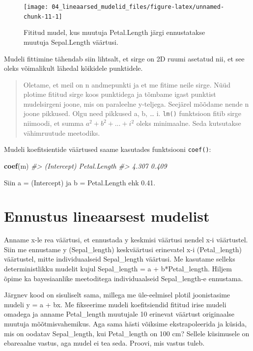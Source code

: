\documentclass[]{book}
\newenvironment{Shaded}{\begin{snugshade}}{\end{snugshade}}
\newcommand{\KeywordTok}[1]{\textcolor[rgb]{0.13,0.29,0.53}{\textbf{#1}}}
\newcommand{\CommentTok}[1]{\textcolor[rgb]{0.56,0.35,0.01}{\textit{#1}}}
\newcommand{\NormalTok}[1]{#1}
\begin{document}
\begin{figure}

{\centering \texttt{[image: 04\_lineaarsed\_mudelid\_files/figure-latex/unnamed-chunk-11-1]} 

}

\caption{Fititud mudel, kus muutuja Petal.Length järgi ennustatakse muutuja Sepal.Length väärtusi.}\label{fig:unnamed-chunk-11}
\end{figure}

Mudeli fittimine tähendab siin lihtsalt, et sirge on 2D ruumi asetatud
nii, et see oleks võimalikult lähedal kõikidele punktidele.

\begin{quote}
Oletame, et meil on n andmepunkti ja et me fitime neile sirge. Nüüd
plotime fititud sirge koos punktidega ja tõmbame igast punktist
mudelsirgeni joone, mis on paraleelne y-teljega. Seejärel mõõdame nende
n joone pikkused. Olgu need pikkused a, b, \ldots{} i. \texttt{lm()}
funktsioon fitib sirge niimoodi, et summa \(a^2 + b^2 + ... + i^2\)
oleks minimaalne. Seda kutsutakse vähimruutude meetodiks.
\end{quote}

Mudeli koefitsientide väärtused saame kasutades funktsiooni
\texttt{coef()}:

\begin{Shaded}
\begin{Highlighting}[]
\KeywordTok{coef}\NormalTok{(m)}
\CommentTok{#>  (Intercept) Petal.Length }
\CommentTok{#>        4.307        0.409}
\end{Highlighting}
\end{Shaded}

Siin a = (Intercept) ja b = Petal.Length ehk 0.41.

\section{Ennustus lineaarsest
mudelist}\label{ennustus-lineaarsest-mudelist}

Anname x-le rea väärtusi, et ennustada y keskmisi väärtusi nendel x-i
väärtustel. Siin me ennustame y (Sepal\_length) keskväärtusi erinevatel
x-i (Petal\_length) väärtustel, mitte individuaalseid Sepal\_length
väärtusi. Me kasutame selleks deterministlikku mudelit kujul
Sepal\_length = a + b*Petal\_length. Hiljem õpime ka bayesiaanlike
meetoditega individuaalseid Sepal\_length-e ennustama.

Järgnev kood on sisuliselt sama, millega me üle-eelmisel plotil
joonistasime mudeli y = a + bx. Me fikseerime mudeli koefitsiendid
fititud irise mudeli omadega ja anname Petal\_length muutujale 10
erinevat väärtust originaalse muutuja mõõtmisvahemikus. Aga sama hästi
võiksime ekstrapoleerida ja küsida, mis on oodatav Sepal\_length, kui
Petal\_length on 100 cm? Sellele küsimusele on ebareaalne vastus, aga
mudel ei tea seda. Proovi, mis vastus tuleb.
\end{document}

